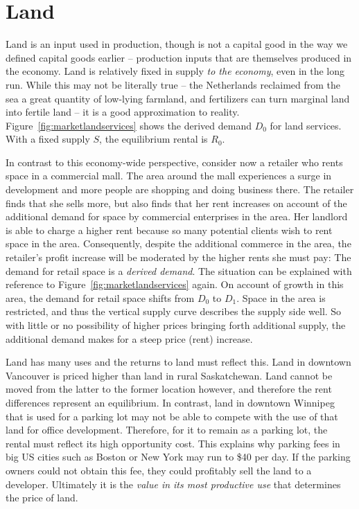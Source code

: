 \section{Land}\label{sec:ch12sec6}

Land is an input used in production, though is not a capital good in the way
we defined capital goods earlier -- production inputs that are themselves
produced in the economy. Land is relatively fixed in supply \textit{to the
economy}, even in the long run. While this may not be literally true -- the
Netherlands reclaimed from the sea a great quantity of low-lying farmland,
and fertilizers can turn marginal land into fertile land -- it is a good
approximation to reality. Figure~\ref{fig:marketlandservices} shows the
derived demand $D_0$ for land services. With a fixed supply $S$, the
equilibrium rental is $R_0$.



\newhtmlpage

In contrast to this economy-wide perspective, consider now a retailer who
rents space in a commercial mall. The area around the mall experiences a
surge in development and more people are shopping and doing business there.
The retailer finds that she sells more, but also finds that her rent
increases on account of the additional demand for space by commercial
enterprises in the area. Her landlord is able to charge a higher rent
because so many potential clients wish to rent space in the area.
Consequently, despite the additional commerce in the area, the retailer's
profit increase will be moderated by the higher rents she must pay: The
demand for retail space is a \textit{derived demand}. The situation can be
explained with reference to Figure~\ref{fig:marketlandservices} again. On
account of growth in this area, the demand for retail space shifts from 
$D_{0}$ to $D_{1}$. Space in the area is restricted, and thus the vertical
supply curve describes the supply side well. So with little or no
possibility of higher prices bringing forth additional supply, the
additional demand makes for a steep price (rent) increase. 

Land has many uses and the returns to land must reflect this. Land in
downtown Vancouver is priced higher than land in rural Saskatchewan. Land
cannot be moved from the latter to the former location however, and
therefore the rent differences represent an equilibrium. In contrast, land
in downtown Winnipeg that is used for a parking lot may not be able to
compete with the use of that land for office development. Therefore, for it
to remain as a parking lot, the rental must reflect its high opportunity
cost. This explains why parking fees in big US cities such as Boston or New
York may run to \$40 per day. If the parking owners could not obtain this
fee, they could profitably sell the land to a developer. Ultimately it is
the \textit{value in its most productive use} that determines the price of
land.